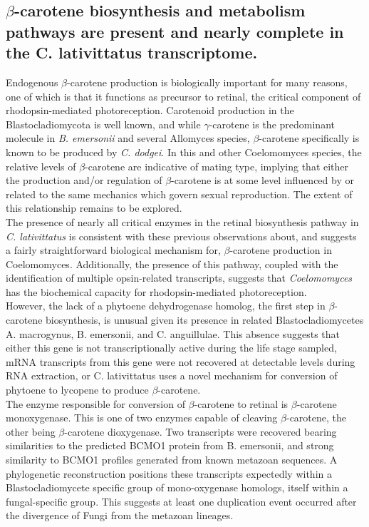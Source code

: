 \subsection{$\beta$-carotene biosynthesis and metabolism pathways are present and nearly complete in the C. lativittatus transcriptome.}
Endogenous $\beta$-carotene production is biologically important for many reasons, one of which is that it functions as precursor to retinal, the critical component of rhodopsin-mediated photoreception. Carotenoid production in the Blastocladiomycota is well known, and while $\gamma$-carotene is the predominant molecule in \textit{B. emersonii} and several Allomyces species, $\beta$-carotene specifically is known to be produced by \textit{C. dodgei}. In this and other Coelomomyces species, the relative levels of $\beta$-carotene are indicative of mating type, implying that either the production and/or regulation of $\beta$-carotene is at some level influenced by or related to the same mechanics which govern sexual reproduction. The extent of this relationship remains to be explored. \\
\indent The presence of nearly all critical enzymes in the retinal biosynthesis pathway in \textit{C. lativittatus} is consistent with these previous observations about, and suggests a fairly straightforward biological mechanism for, $\beta$-carotene production in Coelomomyces. Additionally, the presence of this pathway, coupled with the identification of multiple opsin-related transcripts, suggests that \textit{Coelomomyces} has the biochemical capacity for rhodopsin-mediated photoreception. \\
\indent However, the lack of a phytoene dehydrogenase homolog, the first step in $\beta$-carotene biosynthesis, is unusual given its presence in related Blastocladiomycetes A. macrogynus, B. emersonii, and C. anguillulae. This absence suggests that either this gene is not transcriptionally active during the life stage sampled, mRNA transcripts from this gene were not recovered at detectable levels during RNA extraction, or C. lativittatus uses a novel mechanism for conversion of phytoene to lycopene to produce $\beta$-carotene. \\
\indent The enzyme responsible for conversion of $\beta$-carotene to retinal is $\beta$-carotene monoxygenase. This is one of two enzymes capable of cleaving $\beta$-carotene, the other being $\beta$-carotene dioxygenase. Two transcripts were recovered bearing similarities to the predicted BCMO1 protein from  B. emersonii, and strong similarity to BCMO1 profiles generated from known metazoan sequences. A phylogenetic reconstruction positions these transcripts expectedly within a Blastocladiomycete specific group of mono-oxygenase homologs, itself within a fungal-specific group. This suggests at least one duplication event occurred after the divergence of Fungi from the metazoan lineages. \\
